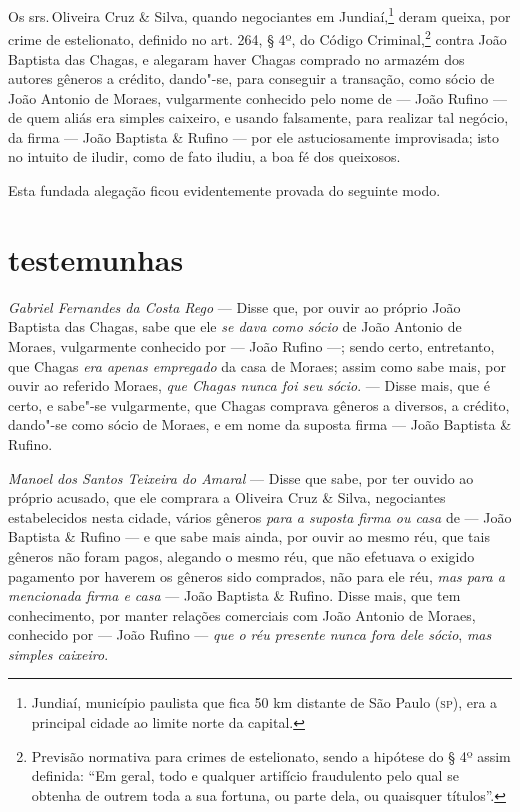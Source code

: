 \asterisc

Os srs.\,Oliveira Cruz \& Silva, quando negociantes em Jundiaí,\footnote{
  Jundiaí, município paulista que fica 50 km distante de São Paulo (\textsc{sp}),
  era a principal cidade ao limite norte da capital.} deram queixa, por
crime de estelionato, definido no art. 264, § 4º, do Código
Criminal,\footnote{Previsão normativa para crimes de estelionato,
  sendo a hipótese do § 4º assim definida: ``Em geral, todo e qualquer
  artifício fraudulento pelo qual se obtenha de outrem toda a sua
  fortuna, ou parte dela, ou quaisquer títulos''.} contra João Baptista
das Chagas, e alegaram haver Chagas comprado no armazém dos autores
gêneros a crédito, dando"-se, para conseguir a transação, como sócio de
João Antonio de Moraes, vulgarmente conhecido pelo nome de --- João
Rufino --- de quem aliás era simples caixeiro, e usando falsamente,
para realizar tal negócio, da firma --- João Baptista \& Rufino ---
por ele astuciosamente improvisada; isto no intuito de iludir, como de
fato iludiu, a boa fé dos queixosos.

Esta fundada alegação ficou evidentemente provada do seguinte modo.

\section*{testemunhas}

\noindent\emph{Gabriel Fernandes da Costa Rego} --- Disse que, por ouvir ao
próprio João Baptista das Chagas, sabe que ele \emph{se dava como sócio}
de João Antonio de Moraes, vulgarmente conhecido por --- João Rufino ---;
sendo certo, entretanto, que Chagas \emph{era apenas empregado} da casa
de Moraes; assim como sabe mais, por ouvir ao referido Moraes, \emph{que
Chagas nunca foi seu sócio}. --- Disse mais, que é certo, e sabe"-se
vulgarmente, que Chagas comprava gêneros a diversos, a crédito, dando"-se
como sócio de Moraes, e em nome da suposta firma --- João Baptista \&
Rufino.\medskip

\noindent\emph{Manoel dos Santos Teixeira do Amaral} --- Disse que sabe, por ter
ouvido ao próprio acusado, que ele comprara a Oliveira Cruz \& Silva,
negociantes estabelecidos nesta cidade, vários gêneros \emph{para a
suposta firma ou casa} de --- João Baptista \& Rufino --- e que sabe
mais ainda, por ouvir ao mesmo réu, que tais gêneros não foram pagos,
alegando o mesmo réu, que não efetuava o exigido pagamento por haverem
os gêneros sido comprados, não para ele réu, \emph{mas para a mencionada
firma e casa} --- João Baptista \& Rufino. Disse mais, que tem
conhecimento, por manter relações comerciais com João Antonio de Moraes,
conhecido por --- João Rufino --- \emph{que o réu presente nunca fora
dele sócio}, \emph{mas simples caixeiro}.\medskip

